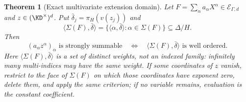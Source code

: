 \documentclass[11pt]{article}
\newtheorem{theorem}{Theorem}[section]
\theoremstyle{plain}
\theoremstyle{plain}
\theoremstyle{plain}
\theoremstyle{definition}
\theoremstyle{definition}
\theoremstyle{definition}
\theoremstyle{definition}
\theoremstyle{remark}
\newcommand{\inner}[2]{\langle#1,#2\rangle}
\begin{document}
\begin{theorem}[Exact multivariate extension domain]\label{ent:mv:thm:domain}
Let $F=\sum_\alpha a_\alpha X^\alpha\in\mathcal E_{\Gamma,d}$ and
$z\in(\KD^\times)^d$. Put $\bar\delta_j=\pi_H(v(z_j))$ and
\[
 \inner{\Sigma(F)}{\bar\delta}=\{\inner\alpha{\bar\delta}:\alpha\in\Sigma(F)\}
 \subseteq\Delta/H .
\]
Then
\begin{equation}\label{ent:mv:eq:main}
 (a_\alpha z^\alpha)_\alpha\text{ is strongly summable}
 \quad\Longleftrightarrow\quad
 \inner{\Sigma(F)}{\bar\delta}\text{ is well ordered.}
\end{equation}
Here $\inner{\Sigma(F)}{\bar\delta}$ is a set of distinct weights, not an
indexed family: infinitely many multi-indices may have the same weight. If
some coordinates of $z$ vanish, restrict to the face of $\Sigma(F)$ on which
those coordinates have exponent zero, delete them, and apply the same
criterion; if no variable remains, evaluation is the constant coefficient.
\end{theorem}
\end{document}
